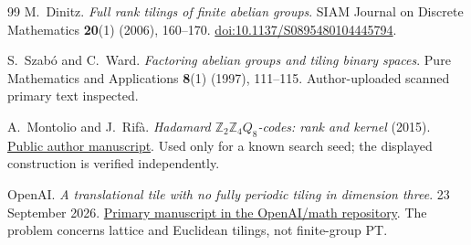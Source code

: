 \documentclass[11pt]{article}
\theoremstyle{definition}\newtheorem{definition}[theorem]{Definition}
\theoremstyle{remark}\newtheorem{remark}[theorem]{Remark}
\begin{document}
\begin{thebibliography}{99}
 M.~Dinitz.
\emph{Full rank tilings of finite abelian groups}.
SIAM Journal on Discrete Mathematics \textbf{20}(1) (2006), 160--170.
\href{https://doi.org/10.1137/S0895480104445794}{doi:10.1137/S0895480104445794}.

 S.~Szab\'o and C.~Ward.
\emph{Factoring abelian groups and tiling binary spaces}.
Pure Mathematics and Applications \textbf{8}(1) (1997), 111--115.
Author-uploaded scanned primary text inspected.

 A.~Montolio and J.~Rif\`a.
\emph{Hadamard $\mathbb Z_2\mathbb Z_4Q_8$-codes: rank and kernel} (2015).
\href{https://ddd.uab.cat/pub/caplli/2015/142878/codtheapp_a2015p273.pdf}{Public author manuscript}.
Used only for a known search seed; the displayed construction is verified independently.

 OpenAI.
\emph{A translational tile with no fully periodic tiling in dimension three}.
23 September 2026.
\href{https://github.com/openai/math/blob/main/preprints/A-translational-tile-with-no-fully-periodic-tiling-in-dimension-three-September-23-2026/paper.pdf}{Primary manuscript in the OpenAI/math repository}.
The problem concerns lattice and Euclidean tilings, not finite-group PT.

\end{thebibliography}
\end{document}
